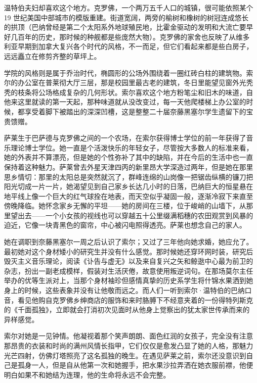 \documentclass[AutoFakeBold=true]{book}
\begin{document}
温特伯夫妇却喜欢这个地方。克罗佛，一个两万五千人口的城镇，很可能依照某个 19 世纪美国中部城市的模版重建。街道宽阔，两旁的榆树和橡树的树冠连成悠长的拱顶（巴纳曾经是第二个太阳系外地球殖民地，比霍金驱动的发明和大流亡要早好几百年的历史，那时候的种舰都是些庞然大物）。克罗佛的家舍也反映了从维多利亚早期到加拿大复兴各个时代的风格，不一而足，但它们看起来都是些白房子，远远矗立在修剪齐整的草坪上。

学院的风格则是属于乔治时代，椭圆形的公场外围绕着一圈红砖白柱的建筑物。索尔的办公室在普莱彻大厅三层，那是校园里最古老的建筑，冬日里能望见窗外光秃秃的枝条将公场格成复杂的几何形状。索尔喜欢这个地方粉笔尘和旧木的味道，自他来这里就读的第一天起，那种味道就从没改变过，每一天他爬楼梯上办公室的时候，都享受着脚下被踏出的深深凹槽，这是整整二十届奈藤黑塞尔学生遗留下的宝贵馈赠。

萨莱生于巴萨德与克罗佛之间的一个农场，在索尔获得博士学位的前一年获得了音乐理论博士学位。她一直是个活泼快乐的年轻女子，尽管按大多数人的标准来看，她的外表并不算漂亮，但是她的个性弥补了其中的缺陷，并在今后的生活中也一直保持着这种魅力。萨莱曾去外星天津四丙的新里昂大学深造过两年，但是她在那里思乡情切：那里的太阳总是突然就沉了，群峰连绵的山岗像一把锯齿纵横的镰刀把阳光切成一片一片，她渴望见到自己家乡长达几小时的日落，巴纳巨大的恒星悬在地平线上像一个巨大的红气球拴在地表，而天空似乎凝固一般，逐渐冷寂下来直至傍晚降临。她怀念家乡无懈的平坦——她的房间在三楼，位于峻峭的山墙下，从那里望出去——一个小女孩的视线也可以穿越五十公里缀满稻穗的农田观赏到风暴的迫近，它像一块青黑色的窗帘，中心被闪电照得透亮。萨莱也想念自己的家人。

她在调职到奈藤黑塞尔一周之后认识了索尔；又过了三年他向她求婚，她应允了。最初她对这个身材矮小的研究生并没有什么感觉。那时候她还穿环网时装，研究后毁灭主义音乐理论，阅读《讣告与虚无》以及来自复兴之矢和鲸逖中心最为前卫的杂志，扮出一副老成模样，假装对生活厌倦，故意使用叛逆词句。在那场莫尔主任举办的优等生派对上，当那个身材袖珍但感情真挚的历史系学生将什锦水果洒到她身上的时候，这些表象并没有让他敬而远之。而人们一听到索尔·温特伯的巴纳口音，看见他购自克罗佛乡绅商店的服饰和来时胳膊下不经意夹着的一份得特列斯克的《千面孤独》，立即就会打消初次见面时从他身上觉察出的犹太家世传承而来的异样感觉。

索尔对她是一见钟情。他凝视着那个笑声朗朗、面色红润的女孩子，完全没有注意那昂贵的衣装和时尚的满州风情长指甲，它们仅仅是愈发凸显了她的人格，那魅力光芒四射，仿佛灯塔照亮了这名孤独的晚生。在遇见萨莱之前，索尔还没意识到自己是孤身一人，但是自从他第一次和她握手，把水果沙拉弄洒在她衣服前襟，他便明白如果不和她结为连理，他的生命将永远不会完整。
\end{document}
